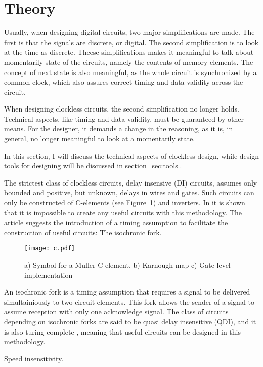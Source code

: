 \section{Theory}

Usually, when designing digital circuits, two major simplifications
are made. The first is that the signals are discrete, or digital. The
second simplification is to look at the time as discrete. Theese
simplifications makes it meaningful to talk about momentarily state of
the circuits, namely the contents of memory elements. The concept of
next state is also meaningful, as the whole circuit is synchronized by
a common clock, which also assures correct timing and data validity
across the circuit.

When designing clockless circuits, the second simplification no longer
holds. Technical aspects, like timing and data validity, must be
guaranteed by other means. For the designer, it demands a change in
the reasoning, as it is, in general, no longer meaningful to look at a
momentarily state.

In this section, I will discuss the technical aspects of clockless
design, while design tools for designing will be discussed in
section~\ref{sec:tools}.

The strictest class of clockless circuits, delay insensive (DI)
circuits, assumes only bounded and positive, but unknown, delays in
wires and gates. Such circuits can only be constructed of C-elements
(see Figure~\ref{fig:c}) and inverters. In \cite{dilimit} it is shown
that it is impossible to create any useful circuits with this
methodology. The article suggests the introduction of a timing
assumption to facilitate the construction of useful circuits: The
isochronic fork.

\begin{figure}[htbp]
  \centering
  \texttt{[image: c.pdf]}
  \caption{a) Symbol for a Muller C-element. b) Karnough-map c)
    Gate-level implementation}
  \label{fig:c}
\end{figure}

An isochronic fork is a timing assumption that requires a signal to be
delivered simultainiously to two circuit elements. This fork allows
the sender of a signal to assume reception with only one acknowledge
signal. The class of circuits depending on isochronic forks are said
to be quasi delay insensitive (QDI), and it is also turing complete
\cite{turing}, meaning that useful circuits can be designed in this
methodology.

Speed insensitivity.

